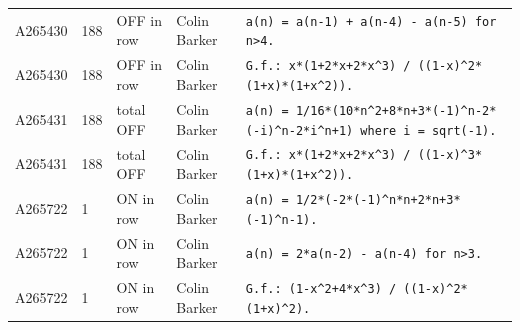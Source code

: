 \documentclass[11pt]{article}
\theoremstyle{definition}
\theoremstyle{remark}
\begin{document}
{\begin{longtable}{p{1.3cm}p{0.7cm}p{2.4cm}p{2.3cm}p{7.3cm}}
A265430 & 188 & OFF in row & Colin Barker & \texttt{a(n)\allowbreak{} \allowbreak{}=\allowbreak{} \allowbreak{}a(n-\allowbreak{}1)\allowbreak{} \allowbreak{}+\allowbreak{} \allowbreak{}a(n-\allowbreak{}4)\allowbreak{} \allowbreak{}-\allowbreak{} \allowbreak{}a(n-\allowbreak{}5)\allowbreak{} \allowbreak{}for \allowbreak{}n>4.} \\
A265430 & 188 & OFF in row & Colin Barker & \texttt{G.f.: \allowbreak{}x*\allowbreak{}(1+\allowbreak{}2*\allowbreak{}x+\allowbreak{}2*\allowbreak{}x\^{}3)\allowbreak{} \allowbreak{}/\allowbreak{} \allowbreak{}((1-\allowbreak{}x)\allowbreak{}\^{}2*\allowbreak{}(1+\allowbreak{}x)\allowbreak{}*\allowbreak{}(1+\allowbreak{}x\^{}2)\allowbreak{})\allowbreak{}.} \\
A265431 & 188 & total OFF & Colin Barker & \texttt{a(n)\allowbreak{} \allowbreak{}=\allowbreak{} \allowbreak{}1/\allowbreak{}16*\allowbreak{}(10*\allowbreak{}n\^{}2+\allowbreak{}8*\allowbreak{}n+\allowbreak{}3*\allowbreak{}(-\allowbreak{}1)\allowbreak{}\^{}n-\allowbreak{}2*\allowbreak{}(-\allowbreak{}i)\allowbreak{}\^{}n-\allowbreak{}2*\allowbreak{}i\^{}n+\allowbreak{}1)\allowbreak{} \allowbreak{}where \allowbreak{}i \allowbreak{}=\allowbreak{} \allowbreak{}sqrt(-\allowbreak{}1)\allowbreak{}.} \\
A265431 & 188 & total OFF & Colin Barker & \texttt{G.f.: \allowbreak{}x*\allowbreak{}(1+\allowbreak{}2*\allowbreak{}x+\allowbreak{}2*\allowbreak{}x\^{}3)\allowbreak{} \allowbreak{}/\allowbreak{} \allowbreak{}((1-\allowbreak{}x)\allowbreak{}\^{}3*\allowbreak{}(1+\allowbreak{}x)\allowbreak{}*\allowbreak{}(1+\allowbreak{}x\^{}2)\allowbreak{})\allowbreak{}.} \\
A265722 & 1 & ON in row & Colin Barker & \texttt{a(n)\allowbreak{} \allowbreak{}=\allowbreak{} \allowbreak{}1/\allowbreak{}2*\allowbreak{}(-\allowbreak{}2*\allowbreak{}(-\allowbreak{}1)\allowbreak{}\^{}n*\allowbreak{}n+\allowbreak{}2*\allowbreak{}n+\allowbreak{}3*\allowbreak{}(-\allowbreak{}1)\allowbreak{}\^{}n-\allowbreak{}1)\allowbreak{}.} \\
A265722 & 1 & ON in row & Colin Barker & \texttt{a(n)\allowbreak{} \allowbreak{}=\allowbreak{} \allowbreak{}2*\allowbreak{}a(n-\allowbreak{}2)\allowbreak{} \allowbreak{}-\allowbreak{} \allowbreak{}a(n-\allowbreak{}4)\allowbreak{} \allowbreak{}for \allowbreak{}n>3.} \\
A265722 & 1 & ON in row & Colin Barker & \texttt{G.f.: \allowbreak{}(1-\allowbreak{}x\^{}2+\allowbreak{}4*\allowbreak{}x\^{}3)\allowbreak{} \allowbreak{}/\allowbreak{} \allowbreak{}((1-\allowbreak{}x)\allowbreak{}\^{}2*\allowbreak{}(1+\allowbreak{}x)\allowbreak{}\^{}2)\allowbreak{}.} \\

\end{longtable}}
\end{document}
